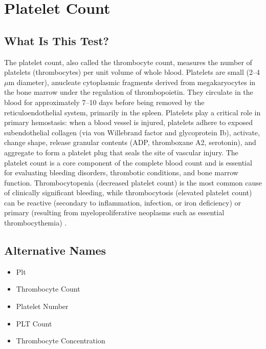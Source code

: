 \chapter{Platelet Count}

\section*{What Is This Test?}
The platelet count, also called the thrombocyte count, measures the number of platelets (thrombocytes) per unit volume of whole blood. Platelets are small (2--4 $\mu$m diameter), anucleate cytoplasmic fragments derived from megakaryocytes in the bone marrow under the regulation of thrombopoietin. They circulate in the blood for approximately 7--10 days before being removed by the reticuloendothelial system, primarily in the spleen. Platelets play a critical role in primary hemostasis: when a blood vessel is injured, platelets adhere to exposed subendothelial collagen (via von Willebrand factor and glycoprotein Ib), activate, change shape, release granular contents (ADP, thromboxane A2, serotonin), and aggregate to form a platelet plug that seals the site of vascular injury. The platelet count is a core component of the complete blood count and is essential for evaluating bleeding disorders, thrombotic conditions, and bone marrow function. Thrombocytopenia (decreased platelet count) is the most common cause of clinically significant bleeding, while thrombocytosis (elevated platelet count) can be reactive (secondary to inflammation, infection, or iron deficiency) or primary (resulting from myeloproliferative neoplasms such as essential thrombocythemia) \cite{tierney2023current}.

\section*{Alternative Names}
\begin{itemize}
  \item Plt
  \item Thrombocyte Count
  \item Platelet Number
  \item PLT Count
  \item Thrombocyte Concentration
\end{itemize}
